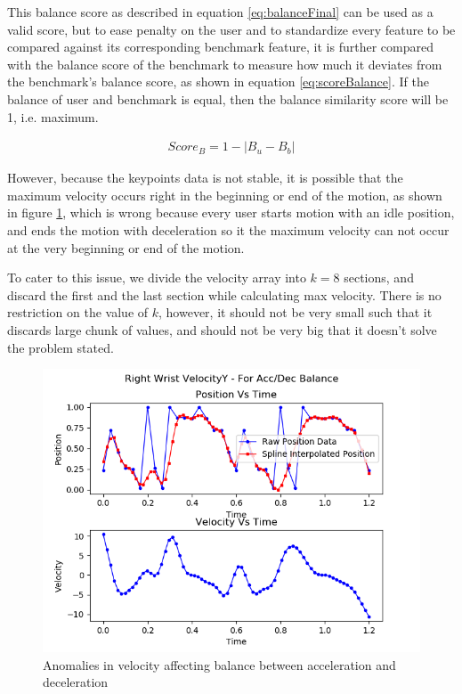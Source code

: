 This balance score as described in equation \ref{eq:balanceFinal} can be used as a valid score, but to ease penalty on the user and to standardize every feature to be compared against its corresponding benchmark feature, it is further compared with the balance score of the benchmark to measure how much it deviates from the benchmark's balance score, as shown in equation \ref{eq:scoreBalance}. If the balance of user and benchmark is equal, then the balance similarity score will be 1, i.e. maximum.

\begin{gather} 
  Score_{B} = 1 - |B_u - B_b|
  \label{eq:scoreBalance}
\end{gather}

However, because the keypoints data is not stable, it is possible that the maximum velocity occurs right in the beginning or end of the motion, as shown in figure \ref{fig:accDectimes_maxAtStart}, which is wrong because every user starts motion with an idle position, and ends the motion with deceleration so it the maximum velocity can not occur at the very beginning or end of the motion.

To cater to this issue, we divide the velocity array into $k = 8$ sections, and discard the first and the last section while calculating max velocity. There is no restriction on the value of $k$, however, it should not be very small such that it discards large chunk of values, and should not be very big that it doesn't solve the problem stated. 

\begin{figure}
  \centering
  \includegraphics[scale=0.8]{images/graphs/accDecPhase_Video5_good_RWrist.png}
  \caption{Anomalies in velocity affecting balance between acceleration and deceleration}
  \label{fig:accDectimes_maxAtStart}
\end{figure}

